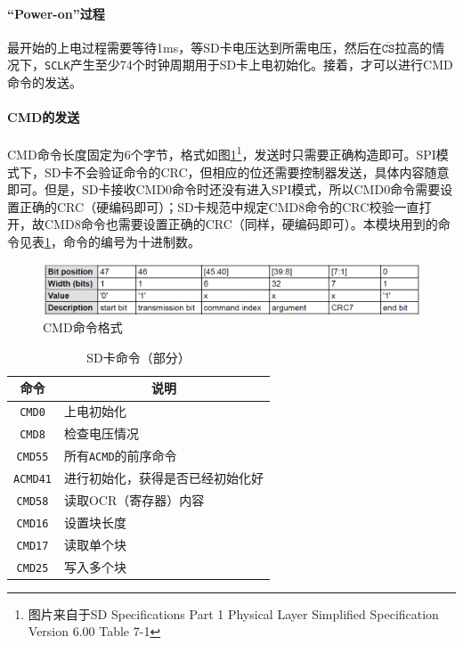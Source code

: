 \documentclass[11pt,utf8]{report}
\begin{document}
	\paragraph{“Power-on”过程} 最开始的上电过程需要等待1ms，等SD卡电压达到所需电压，然后在$\mathtt{\overline{CS}}$拉高的情况下，\texttt{SCLK}产生至少74个时钟周期用于SD卡上电初始化。接着，才可以进行CMD命令的发送。

	\paragraph{CMD的发送} CMD命令长度固定为6个字节，格式如图\ref{cmd}\footnote{图片来自于SD Specifications Part 1 Physical Layer Simplified Specification Version 6.00 Table 7-1}，发送时只需要正确构造即可。SPI模式下，SD卡不会验证命令的CRC，但相应的位还需要控制器发送，具体内容随意即可。但是，SD卡接收CMD0命令时还没有进入SPI模式，所以CMD0命令需要设置正确的CRC（硬编码即可）；SD卡规范中规定CMD8命令的CRC校验一直打开，故CMD8命令也需要设置正确的CRC（同样，硬编码即可）。本模块用到的命令见表\ref{cmds}，命令的编号为十进制数。
	
	\begin{figure}[h!]
		\centering
		\includegraphics[width=\textwidth]{cmd}
		\caption{CMD命令格式}
		\label{cmd}
	\end{figure}
	
	\begin{table}[h]
	\centering
	\begin{tabular}{c|l}
	\toprule[1.2pt]
	\multicolumn{1}{c|}{\textbf{命令}} & \multicolumn{1}{c}{\textbf{说明}} \\
	\midrule[1.2pt]
	\texttt{CMD0} & 上电初始化 \\ \hline
	\texttt{CMD8} & 检查电压情况 \\ \hline
	\texttt{CMD55} & 所有\texttt{ACMD}的前序命令 \\ \hline
	\texttt{ACMD41} & 进行初始化，获得是否已经初始化好 \\ \hline
	\texttt{CMD58} & 读取OCR（寄存器）内容 \\ \hline
	\texttt{CMD16} & 设置块长度 \\ \hline
	\texttt{CMD17} & 读取单个块 \\ \hline
	\texttt{CMD25} & 写入多个块 \\
	\bottomrule[1.2pt]
	\end{tabular}
	\caption{SD卡命令（部分）}
	\label{cmds}
	\end{table}
	
\end{document}
